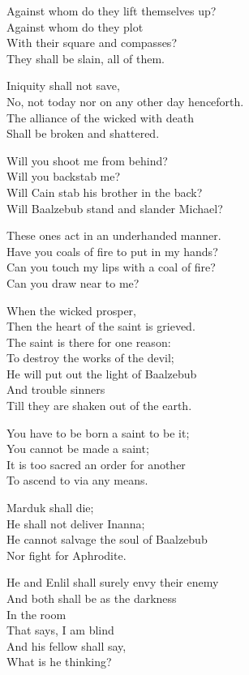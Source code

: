 \documentclass[
]{book}
\begin{document}
Against whom do they lift themselves up?\\
Against whom do they plot\\
With their square and compasses?\\
They shall be slain, all of them.

Iniquity shall not save,\\
No, not today nor on any other day henceforth.\\
The alliance of the wicked with death\\
Shall be broken and shattered.

Will you shoot me from behind?\\
Will you backstab me?\\
Will Cain stab his brother in the back?\\
Will Baalzebub stand and slander Michael?

These ones act in an underhanded manner.\\
Have you coals of fire to put in my hands?\\
Can you touch my lips with a coal of fire?\\
Can you draw near to me?

When the wicked prosper,\\
Then the heart of the saint is grieved.\\
The saint is there for one reason:\\
To destroy the works of the devil;\\
He will put out the light of Baalzebub\\
And trouble sinners\\
Till they are shaken out of the earth.

You have to be born a saint to be it;\\
You cannot be made a saint;\\
It is too sacred an order for another\\
To ascend to via any means.

Marduk shall die;\\
He shall not deliver Inanna;\\
He cannot salvage the soul of Baalzebub\\
Nor fight for Aphrodite.

He and Enlil shall surely envy their enemy\\
And both shall be as the darkness\\
In the room\\
That says, I am blind\\
And his fellow shall say,\\
What is he thinking?
\end{document}
